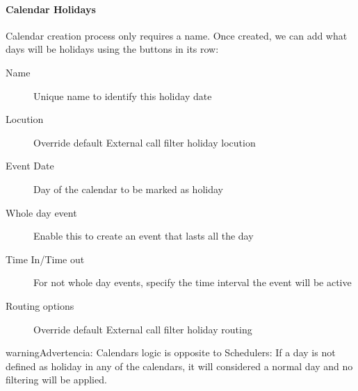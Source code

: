 \documentclass[letterpaper,10pt,spanish]{sphinxmanual}
\begin{document}
\paragraph{Calendar Holidays}
\label{administration_portal/client/vpbx/routing_tools/calendars:calendar-holidays}
Calendar creation process only requires a name. Once created, we can add what
days will be holidays using the buttons in its row:
\begin{description}
\item[{Name}] \leavevmode{}\label{administration_portal/client/vpbx/routing_tools/calendars:term-name}
Unique name to identify this holiday date

\item[{Locution}] \leavevmode{}\label{administration_portal/client/vpbx/routing_tools/calendars:term-locution}
Override default External call filter holiday locution

\item[{Event Date}] \leavevmode{}\label{administration_portal/client/vpbx/routing_tools/calendars:term-event-date}
Day of the calendar to be marked as holiday

\item[{Whole day event}] \leavevmode{}\label{administration_portal/client/vpbx/routing_tools/calendars:term-whole-day-event}
Enable this to create an event that lasts all the day

\item[{Time In/Time out}] \leavevmode{}\label{administration_portal/client/vpbx/routing_tools/calendars:term-time-in-time-out}
For not whole day events, specify the time interval the event will be active

\item[{Routing options}] \leavevmode{}\label{administration_portal/client/vpbx/routing_tools/calendars:term-routing-options}
Override default External call filter holiday routing

\end{description}

\begin{notice}{warning}{Advertencia:}
Calendars logic is opposite to Schedulers: If a day is not defined
as holiday in any of the calendars, it will considered a normal day and no
filtering will be applied.
\end{notice}
\end{document}
